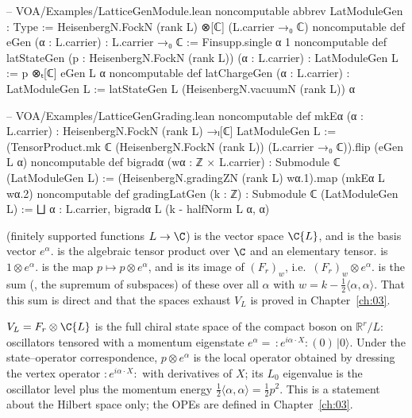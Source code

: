 \begin{leancode}
-- VOA/Examples/LatticeGenModule.lean
noncomputable abbrev LatModuleGen : Type :=
  HeisenbergN.FockN (rank L) ⊗[ℂ] (L.carrier →₀ ℂ)
noncomputable def eGen (α : L.carrier) : L.carrier →₀ ℂ := Finsupp.single α 1
noncomputable def latStateGen (p : HeisenbergN.FockN (rank L)) (α : L.carrier) : LatModuleGen L :=
  p ⊗ₜ[ℂ] eGen L α
noncomputable def latChargeGen (α : L.carrier) : LatModuleGen L :=
  latStateGen L (HeisenbergN.vacuumN (rank L)) α

-- VOA/Examples/LatticeGenGrading.lean
noncomputable def mkEα (α : L.carrier) : HeisenbergN.FockN (rank L) →ₗ[ℂ] LatModuleGen L :=
  (TensorProduct.mk ℂ (HeisenbergN.FockN (rank L)) (L.carrier →₀ ℂ)).flip (eGen L α)
noncomputable def bigradα (wα : ℤ × L.carrier) : Submodule ℂ (LatModuleGen L) :=
  (HeisenbergN.gradingZN (rank L) wα.1).map (mkEα L wα.2)
noncomputable def gradingLatGen (k : ℤ) : Submodule ℂ (LatModuleGen L) :=
  ⨆ α : L.carrier, bigradα L (k - halfNorm L α, α)
\end{leancode}

\begin{dictionary}
 (finitely supported functions $L\to\C$) is the vector space $\C\{L\}$, and
 is the basis vector $e^\alpha$.  is the algebraic tensor product over
$\C$ and  an elementary tensor.  is $1\otimes e^\alpha$.
 is the map $p\mapsto p\otimes e^\alpha$, and  is its image of
$(F_r)_w$, i.e.\ $(F_r)_w\otimes e^\alpha$.  is the sum (, the
supremum of subspaces) of these over all $\alpha$ with $w=k-\tfrac12\langle\alpha,\alpha\rangle$. That
this sum is direct and that the spaces exhaust $V_L$ is proved in Chapter~\ref{ch:03}.
\end{dictionary}

\begin{physics}
$V_L=F_r\otimes\C\{L\}$ is the full chiral state space of the compact boson on $\mathbb R^r/L$: oscillators tensored with a momentum eigenstate $e^\alpha=\,:\!e^{i\alpha\cdot X}\!:(0)\,|0\rangle$. Under the state--operator correspondence, $p\otimes e^\alpha$ is the local operator obtained by dressing the vertex operator $:\!e^{i\alpha\cdot X}\!:$ with derivatives of $X$; its $L_0$ eigenvalue is the oscillator level plus the momentum energy $\tfrac12\langle\alpha,\alpha\rangle=\tfrac12 p^2$. This is a statement about the Hilbert space only; the OPEs are defined in Chapter~\ref{ch:03}.
\end{physics}

